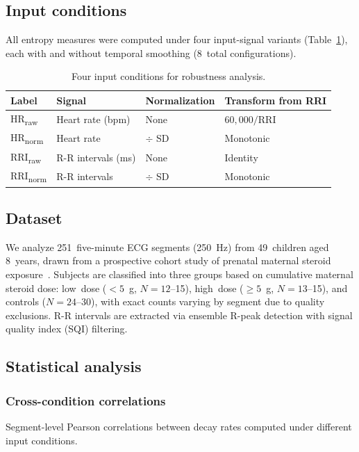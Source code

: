 \documentclass[12pt,a4paper]{article}
\begin{document}
\subsection{Input conditions}\label{sec:conditions}

All entropy measures were computed under four input-signal variants (Table~\ref{tab:conditions}), each with and without temporal smoothing (8~total configurations).

\begin{table}[htbp]
\centering
\caption{Four input conditions for robustness analysis.}\label{tab:conditions}
\begin{tabular}{@{}llll@{}}
\toprule
Label & Signal & Normalization & Transform from RRI \\
\midrule
HR\textsubscript{raw} & Heart rate (bpm) & None & $60{,}000 / \text{RRI}$ \\
HR\textsubscript{norm} & Heart rate & $\div$ SD & Monotonic \\
RRI\textsubscript{raw} & R-R intervals (ms) & None & Identity \\
RRI\textsubscript{norm} & R-R intervals & $\div$ SD & Monotonic \\
\bottomrule
\end{tabular}
\end{table}

\subsection{Dataset}\label{sec:dataset}

We analyze 251~five-minute ECG segments (250~Hz) from 49~children aged 8~years, drawn from a prospective cohort study of prenatal maternal steroid exposure~\citep{frasch2024}.
Subjects are classified into three groups based on cumulative maternal steroid dose: low~dose ($<5$~g, $N = 12$--15), high~dose ($\geq 5$~g, $N = 13$--15), and controls ($N = 24$--30), with exact counts varying by segment due to quality exclusions.
R-R intervals are extracted via ensemble R-peak detection with signal quality index (SQI) filtering.

\subsection{Statistical analysis}\label{sec:stats}

\subsubsection{Cross-condition correlations}
Segment-level Pearson correlations between decay rates computed under different input conditions.
\end{document}
